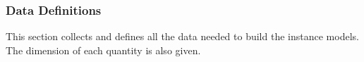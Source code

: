 \documentclass[12pt]{article}
\newcommand{\colAwidth}{0.13\textwidth}
\newcommand{\colBwidth}{0.82\textwidth}
\newcounter{defnum} %
\newcounter{datadefnum} %
\newcommand{\iref}[1]{IM\ref{#1}}
\begin{document}
\subsubsection{Data Definitions}\label{sec_datadef}



This section collects and defines all the data needed to build the instance
models. The dimension of each quantity is also given.  

~\newline


\end{document}
